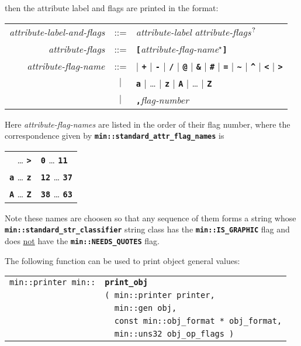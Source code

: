 \documentclass[12pt]{article}
\makeatletter
\newcommand{\TT}[1]{{\tt \bfseries #1}}
\newcommand{\QMARK}{{$^{\,\mbox{\footnotesize ?}}$}}
\newcommand{\ttindex}[1]{\index{#1@{\tt #1}}}
\newcommand{\EOL}{\penalty \exhyphenpenalty}
\newenvironment{indpar}[1][0.3in]%
	{\begin{list}{}%
		     {\setlength{\itemsep}{0in}%
		      \setlength{\topsep}{0in}%
		      \setlength{\parsep}{1ex}%
		      \setlength{\labelwidth}{#1}%
		      \setlength{\leftmargin}{#1}%
		      \addtolength{\leftmargin}{\labelsep}}%
	 \item}%
	{\end{list}}
\newcommand{\LABEL}[1]{\label{#1}}
\newlength{\ARGBREAKLENGTH}
\newcommand{\ARGBREAK}[1][\ARGBREAKLENGTH]{\\&\hspace*{#1}}
\newcommand{\MINKEY}[1]%
	   {\TT{#1}\ttindex{min::#1}\ttindex{#1}}
\makeatother
\begin{document}
then the attribute label and flags are printed in the format:

\newcommand{\TTBS}[1]{\TT{\textbackslash#1}}
\begin{center}
\begin{tabular}{rcl}
{\em attribute-label-and-flags} & ::= & {\em attribute-label}
                                        {\em attribute-flags}\QMARK{} \\
{\em attribute-flags}
    & ::= & \TT{[}{\em attribute-flag-name}$^\star$\TT{]} \\
{\em attribute-flag-name} & ::= &
        \TT{*} $|$ \TT{+} $|$ \TT{-} $|$ \TT{/} $|$ \TT{@}
    $|$ \TT{\&} $|$ \TT{\#} $|$ \TT{=} $|$ \TT{\textasciitilde}
    $|$ \TT{\textasciicircum} $|$ \TT{<} $|$ \TT{>} \\
& $|$ & \TT{a} $|$ \ldots{} $|$ \TT{z} $|$ \TT{A} $|$ \ldots{} $|$ \TT{Z} \\
& $|$ & \TT{,}{\em flag-number}
\end{tabular}
\end{center}

Here {\em attribute-flag-names} are listed in the order of their flag number,
where the correspondence given
by \TT{min::\EOL standard\_\EOL attr\_\EOL flag\_\EOL names} is
\begin{center}
\begin{tabular}{r@{~correspond to flag numbers~}l}
\TT{*} \ldots{} \TT{>} & \TT{0} \ldots{} \TT{11} \\
\TT{a} \ldots{} \TT{z} & \TT{12} \ldots{} \TT{37} \\
\TT{A} \ldots{} \TT{Z} & \TT{38} \ldots{} \TT{63} \\
\end{tabular}
\end{center}

Note these names are choosen so that any sequence of them forms
a string whose \TT{min::stan\-dard\_\EOL str\_\EOL classifier} string
class has the \TT{min::\EOL IS\_\EOL GRAPHIC} flag and does
\underline{not} have the \TT{min::\EOL NEEDS\_\EOL QUOTES} flag.

The following function can be used to print object general values:

\begin{indpar}[1em]\begin{tabular}{r@{}l}
\verb|min::printer min::| & \MINKEY{print\_obj}\ARGBREAK
    \verb|( min::printer printer,|\ARGBREAK
    \verb|  min::gen obj,|\ARGBREAK
    \verb|  const min::obj_format * obj_format,|\ARGBREAK
    \verb|  min::uns32 obj_op_flags )|
\LABEL{MIN::PRINT_OBJ} \\
\end{tabular}\end{indpar}
\end{document}
